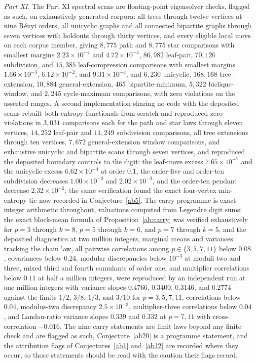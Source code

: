 \documentclass[11pt]{article}
\theoremstyle{definition}
\begin{document}
\emph{Part XI.}  The Part XI spectral scans are floating-point eigensolver checks, flagged as such, on exhaustively generated corpora: all trees through twelve vertices at nine R\'enyi orders, all unicyclic graphs and all connected bipartite graphs through seven vertices with holdouts through thirty vertices, and every eligible local move on each corpus member, giving $8{,}775$ path and $8{,}775$ star comparisons with smallest margins $2.23\times10^{-4}$ and $4.72\times10^{-4}$, $86{,}982$ leaf-pair, $70{,}126$ subdivision, and $15{,}385$ leaf-compression comparisons with smallest margins $1.66\times10^{-3}$, $6.12\times10^{-2}$, and $9.31\times10^{-4}$, and $6{,}230$ unicyclic, $168{,}168$ tree-extension, $10{,}884$ general-extension, $465$ bipartite-minimum, $5{,}322$ biclique-window, and $2{,}245$ cycle-maximum comparisons, with zero violations on the asserted ranges.  A second implementation sharing no code with the deposited scans rebuilt both entropy functionals from scratch and reproduced zero violations in $3{,}031$ comparisons each for the path and star laws through eleven vertices, $14{,}252$ leaf-pair and $11{,}249$ subdivision comparisons, all tree extensions through ten vertices, $7{,}672$ general-extension window comparisons, and exhaustive unicyclic and bipartite scans through seven vertices, and reproduced the deposited boundary controls to the digit: the leaf-move excess $7.65\times10^{-7}$ and the unicyclic excess $6.62\times10^{-4}$ at order $0.1$, the order-five and order-ten subdivision decreases $1.00\times10^{-2}$ and $2.02\times10^{-3}$, and the order-ten pendant decrease $2.32\times10^{-2}$; the same verification found the exact four-vertex min-entropy tie now recorded in Conjecture~\ref{ab5}.  The carry programme is exact integer arithmetic throughout, valuations computed from Legendre digit sums: the exact block-mean formula of Proposition~\ref{ab:carry} was verified exhaustively for $p=3$ through $k=8$, $p=5$ through $k=6$, and $p=7$ through $k=5$, and the deposited diagnostics at two million integers, marginal means and variances tracking the chain law, all pairwise correlations among $p\in\{3,5,7,11\}$ below $0.08$, covariances below $0.24$, modular discrepancies below $10^{-3}$ at moduli two and three, mixed third and fourth cumulants of order one, and multiplier correlations below $0.11$ at half a million integers, were reproduced by an independent run at one million integers with variance slopes $0.4766$, $0.3400$, $0.3146$, and $0.2774$ against the limits $1/2$, $3/8$, $1/3$, and $3/10$ for $p=3,5,7,11$, correlations below $0.04$, modulus-two discrepancy $2.5\times10^{-3}$, multiplier-three correlations below $0.04$, and Landau-ratio variance slopes $0.339$ and $0.332$ at $p=7,11$ with cross-correlation $-0.016$.  The nine carry statements are limit laws beyond any finite check and are flagged as such, Conjecture~\ref{ab20} is a programme statement, and the attribution flags of Conjectures~\ref{ab1} and~\ref{ab12} are recorded where they occur, so those statements should be read with the caution their flags record.
\end{document}
